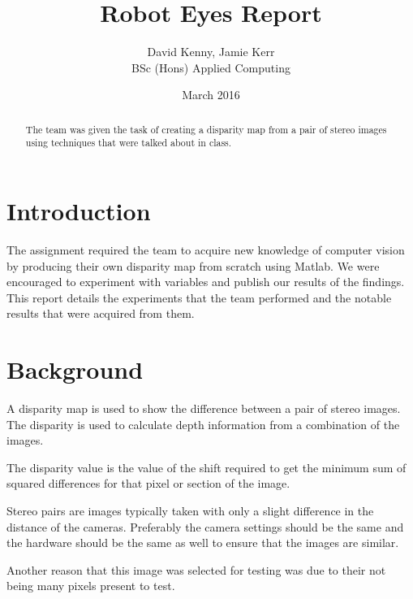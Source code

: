 \documentclass[twocolumn]{article}
\title{Robot Eyes Report}
\author{David Kenny, Jamie Kerr\\BSc (Hons) Applied Computing}
\date{March 2016}
\begin{document}
\maketitle


\begin{abstract}

The team was given the task of creating a disparity map from a pair of stereo images using techniques that were talked about in class. 

\end{abstract}


\section{Introduction}
\vspace{-1ex}

The assignment required the team to acquire new knowledge of computer vision by producing their own disparity map from scratch using Matlab. We were encouraged to experiment with variables and publish our results of the findings. This report details the experiments that the team performed and the notable results that were acquired from them. 


\section{Background}
\vspace{-1ex}

A disparity map \cite{disparitymap} is used to show the difference between a pair of stereo images. The disparity is used to calculate depth information from a combination of the images. 

The disparity value is the value of the shift required to get the minimum sum of squared differences \cite{introssd} for that pixel or section of the image. 

Stereo pairs are images typically taken with only a slight difference in the distance of the cameras. Preferably the camera settings should be the same and the hardware should be the same as well to ensure that the images are similar. 

Another reason that this image was selected for testing was due to their not being many pixels present to test.


\end{document}
